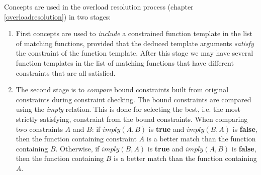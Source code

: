 \documentclass[a4paper,oneside,11pt]{book}
\theoremstyle{definition}
\begin{document}
Concepts are used in the overload resolution process (chapter \ref{overloadresolution}) in two stages:

\begin{enumerate}
\item
First concepts are used to \emph{include} a constrained function template in the list of matching functions, provided
that the deduced template arguments \emph{satisfy} the constraint of the function template.
After this stage we may have several function templates in the list of matching functions that have different constraints that are all satisfied.

\item
The second stage is to \emph{compare} bound constraints built from original constraints during constraint checking.
The bound constraints are compared using the \emph{imply} relation.
This is done for selecting the best, i.e. the most strictly satisfying, constraint from the bound constraints.
When comparing two constraints $A$ and $B$: if $imply(A, B)$ is \textbf{true} and $imply(B, A)$ is \textbf{false},
then the function containing constraint $A$ is a better match than the function containing $B$.
Otherwise, if $imply(B, A)$ is \textbf{true} and $imply(A, B)$ is \textbf{false},
then the function containing $B$ is a better match than the function containing $A$.
\end{enumerate}
\end{document}

